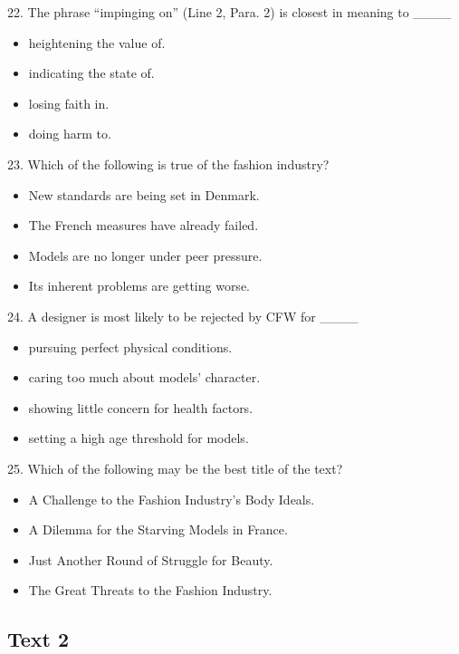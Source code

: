 \documentclass[UTF8,11pt]{ctexart}
\begin{document}
22. The phrase “impinging on” (Line 2, Para. 2) is closest in meaning to \_\_\_\_


\begin{itemize}[leftmargin=2em,itemsep=.2em,topsep=.4em]\item[A.] heightening the value of.
\item[B.] indicating the state of.
\item[C.] losing faith in.
\item[D.] doing harm to.
\end{itemize}

23. Which of the following is true of the fashion industry?


\begin{itemize}[leftmargin=2em,itemsep=.2em,topsep=.4em]\item[A.] New standards are being set in Denmark.
\item[B.] The French measures have already failed.
\item[C.] Models are no longer under peer pressure.
\item[D.] Its inherent problems are getting worse.
\end{itemize}

24. A designer is most likely to be rejected by CFW for \_\_\_\_


\begin{itemize}[leftmargin=2em,itemsep=.2em,topsep=.4em]\item[A.] pursuing perfect physical conditions.
\item[B.] caring too much about models’ character.
\item[C.] showing little concern for health factors.
\item[D.] setting a high age threshold for models.
\end{itemize}

25. Which of the following may be the best title of the text?


\begin{itemize}[leftmargin=2em,itemsep=.2em,topsep=.4em]\item[A.] A Challenge to the Fashion Industry’s Body Ideals.
\item[B.] A Dilemma for the Starving Models in France.
\item[C.] Just Another Round of Struggle for Beauty.
\item[D.] The Great Threats to the Fashion Industry.
\end{itemize}

\subsection*{\textbf{Text 2}}
\end{document}
